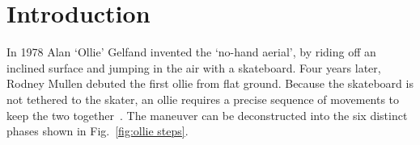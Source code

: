 \documentclass[default,iicol]{sn-jnl}
\begin{document}
\maketitle

\section{Introduction}\label{s_intro}

In 1978 Alan `Ollie' Gelfand invented the `no-hand aerial', by riding off an inclined surface and jumping in the air with a skateboard.
Four years later, Rodney Mullen debuted the first ollie from flat ground.
Because the skateboard is not tethered to the skater, an ollie requires a precise sequence of movements to keep the two together~\cite{frederick_biomechanics_2006}.
The maneuver can be deconstructed into the six
distinct phases shown in Fig.~\ref{fig:ollie steps}.
\end{document}
